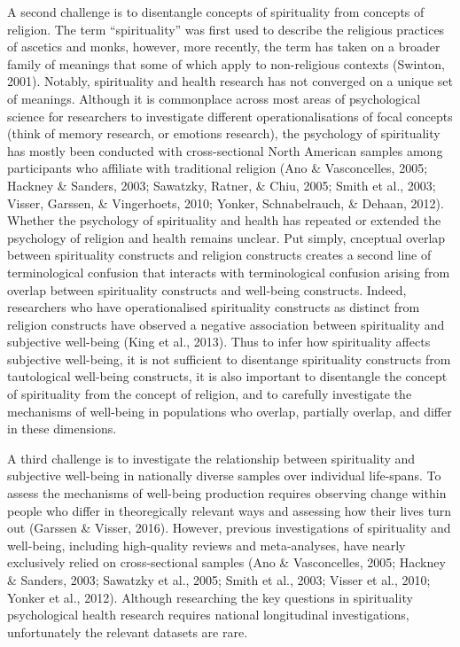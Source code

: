 \documentclass[
  english,
  man,floatsintext]{apa6}
\begin{document}
A second challenge is to disentangle concepts of spirituality from concepts of religion. The term \enquote{spirituality} was first used to describe the religious practices of ascetics and monks, however, more recently, the term has taken on a broader family of meanings that some of which apply to non-religious contexts (Swinton, 2001). Notably, spirituality and health research has not converged on a unique set of meanings. Although it is commonplace across most areas of psychological science for researchers to investigate different operationalisations of focal concepts (think of memory research, or emotions research), the psychology of spirituality has mostly been conducted with cross-sectional North American samples among participants who affiliate with traditional religion (Ano \& Vasconcelles, 2005; Hackney \& Sanders, 2003; Sawatzky, Ratner, \& Chiu, 2005; Smith et al., 2003; Visser, Garssen, \& Vingerhoets, 2010; Yonker, Schnabelrauch, \& Dehaan, 2012). Whether the psychology of spirituality and health has repeated or extended the psychology of religion and health remains unclear. Put simply, cnceptual overlap between spirituality constructs and religion constructs creates a second line of terminological confusion that interacts with terminological confusion arising from overlap between spirituality constructs and well-being constructs. Indeed, researchers who have operationalised spirituality constructs as distinct from religion constructs have observed a negative association between spirituality and subjective well-being (King et al., 2013). Thus to infer how spirituality affects subjective well-being, it is not sufficient to disentange spirituality constructs from tautological well-being constructs, it is also important to disentangle the concept of spirituality from the concept of religion, and to carefully investigate the mechanisms of well-being in populations who overlap, partially overlap, and differ in these dimensions.

A third challenge is to investigate the relationship between spirituality and subjective well-being in nationally diverse samples over individual life-spans. To assess the mechanisms of well-being production requires observing change within people who differ in theoregically relevant ways and assessing how their lives turn out (Garssen \& Visser, 2016). However, previous investigations of spirituality and well-being, including high-quality reviews and meta-analyses, have nearly exclusively relied on cross-sectional samples (Ano \& Vasconcelles, 2005; Hackney \& Sanders, 2003; Sawatzky et al., 2005; Smith et al., 2003; Visser et al., 2010; Yonker et al., 2012). Although researching the key questions in spirituality psychological health research requires national longitudinal investigations, unfortunately the relevant datasets are rare.
\end{document}
